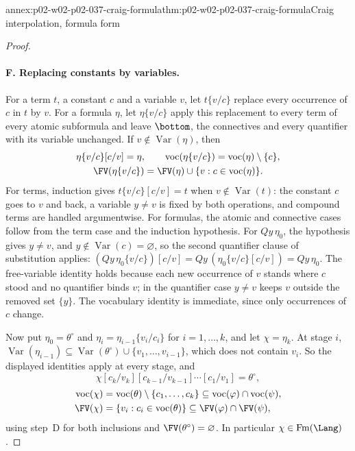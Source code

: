 \begin{annexitem}{annex:p02-w02-p02-037-craig-formula}{thm:p02-w02-p02-037-craig-formula}{Craig interpolation, formula form}
\begin{proof}
\paragraph{F. Replacing constants by variables.}
For a term \(t\), a constant \(c\) and a variable \(v\), let
\(t\{v/c\}\) replace every occurrence of \(c\) in \(t\) by \(v\).  For a
formula \(\eta\), let \(\eta\{v/c\}\) apply this replacement to every term
of every atomic subformula and leave \(\bottom\), the connectives and every
quantifier with its variable unchanged.  If
\(v\notin\operatorname{Var}(\eta)\), then
\[
\begin{gathered}
 \eta\{v/c\}[c/v]=\eta,
 \qquad
 \operatorname{voc}(\eta\{v/c\})=\operatorname{voc}(\eta)\setminus\{c\},\\
 \FV(\eta\{v/c\})=\FV(\eta)\cup\{v:c\in\operatorname{voc}(\eta)\}.
\end{gathered}
\]
For terms, induction gives \(t\{v/c\}[c/v]=t\) when \(v\notin\operatorname{Var}(t)\):
the constant \(c\) goes to \(v\) and back, a variable \(y\neq v\) is fixed
by both operations, and compound terms are handled argumentwise.  For
formulas, the atomic and connective cases follow from the term case and the
induction hypothesis.  For \(Qy\,\eta_0\), the hypothesis gives \(y\neq v\),
and \(y\notin\operatorname{Var}(c)=\varnothing\), so the second quantifier
clause of substitution applies:
\((Qy\,\eta_0\{v/c\})[c/v]=Qy\,(\eta_0\{v/c\}[c/v])=Qy\,\eta_0\).  The
free-variable identity holds because each new occurrence of \(v\) stands
where \(c\) stood and no quantifier binds \(v\); in the quantifier case
\(y\neq v\) keeps \(v\) outside the removed set \(\{y\}\).  The vocabulary
identity is immediate, since only occurrences of \(c\) change.

Now put \(\eta_0=\theta^{\circ}\) and
\(\eta_i=\eta_{i-1}\{v_i/c_i\}\) for \(i=1,\ldots,k\), and let
\(\chi=\eta_k\).  At stage \(i\),
\(\operatorname{Var}(\eta_{i-1})\subseteq
\operatorname{Var}(\theta^{\circ})\cup\{v_1,\ldots,v_{i-1}\}\), which does not
contain \(v_i\).  So the displayed identities apply at every stage, and
\[
 \chi[c_k/v_k][c_{k-1}/v_{k-1}]\cdots[c_1/v_1]=\theta^{\circ},
\]
\[
\begin{aligned}
 \operatorname{voc}(\chi)
   &=\operatorname{voc}(\theta)\setminus\{c_1,\ldots,c_k\}
   \subseteq\operatorname{voc}(\varphi)\cap\operatorname{voc}(\psi),\\
 \FV(\chi)&=\{v_i:c_i\in\operatorname{voc}(\theta)\}
   \subseteq\FV(\varphi)\cap\FV(\psi),
\end{aligned}
\]
using step~D for both inclusions and \(\FV(\theta^{\circ})=\varnothing\).
In particular \(\chi\in\operatorname{Fm}(\Lang)\).


\end{proof}
\end{annexitem}
